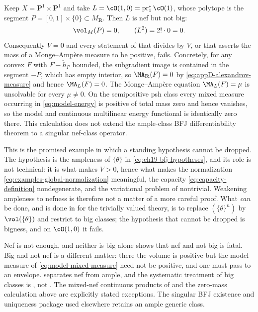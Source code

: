 \begin{example}
\label{ex:ch31-nef-not-big}
Keep $X=\mathbf P^1\times\mathbf P^1$ and take
$L=\cO(1,0)=\operatorname{pr}_1^*\cO(1)$,
whose polytope is the segment $P=[0,1]\times\{0\}\subset M_\mathbf R$.
Then $L$ is nef but not big:
\[
 \vol_M(P)=0,\qquad (L^2)=2!\cdot0=0 .
\]
Consequently $V=0$ and every statement of  that divides by
$V$, or that asserts the mass of a Monge--Amp\`ere measure to be positive,
fails.  Concretely, for any convex $F$ with $F-\check h_P$ bounded, the
subgradient image is contained in the segment $-P$, which has empty
interior, so $\MA_{\mathbf R}(F)=0$ by
\eqref{eq:appD-alexandrov-measure} and hence $\MA_L(F)=0$.  The
Monge--Amp\`ere equation $\MA_L(F)=\mu$ is unsolvable for every
$\mu\neq0$.  On the semipositive psh class every mixed measure occurring
in \eqref{eq:model-energy} is positive of total mass zero and hence
vanishes, so the model and continuous multilinear energy functional is identically
zero there.  This calculation does not extend the ample-class
BFJ differentiability theorem to a singular nef-class operator.

This is the promised example in which a standing hypothesis cannot be
dropped.  The hypothesis is the ampleness of $\{\theta\}$ in
\eqref{eq:ch19-bfj-hypotheses}, and its role is not technical: it is what
makes $V>0$, hence what makes the normalization
\eqref{eq:examples-global-normalization} meaningful, the capacity
\eqref{eq:capacity-definition} nondegenerate, and the variational problem of
 nontrivial.  Weakening ampleness to
nefness is therefore not a matter of a more careful proof.  What
\emph{can} be done, and is done in  for the trivially valued
theory, is to replace $(\{\theta\}^n)$ by $\vol(\{\theta\})$ and restrict
to big classes; the hypothesis that cannot be dropped is bigness, and on
$\cO(1,0)$ it fails.
\end{example}

\begin{warning}{Nef is not enough, and neither is big alone}
 shows that nef and not big is fatal.  Big and not
nef is a different matter: there the volume is positive but the model
measure of \eqref{eq:model-mixed-measure} need not be positive, and one must
pass to an envelope.   separates nef from ample,
and the systematic treatment of big classes is , not
.  The mixed-nef continuous products of  and
the zero-mass calculation above are explicitly stated exceptions.  The
singular BFJ existence and uniqueness package used elsewhere retains an
ample generic class.
\end{warning}

